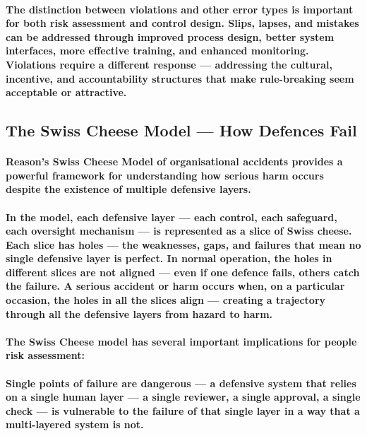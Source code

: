 \paragraph{The distinction between violations and other error types is important for both risk assessment and control design. Slips, lapses, and mistakes can be addressed through improved process design, better system interfaces, more effective training, and enhanced monitoring. Violations require a different response — addressing the cultural, incentive, and accountability structures that make rule-breaking seem acceptable or attractive.}

\subsection{The Swiss Cheese Model — How Defences Fail}
\paragraph{\textbf{Reason's Swiss Cheese Model} of organisational accidents provides a powerful framework for understanding how serious harm occurs despite the existence of multiple defensive layers.}
\paragraph{In the model, each defensive layer — each control, each safeguard, each oversight mechanism — is represented as a slice of Swiss cheese. Each slice has holes — the weaknesses, gaps, and failures that mean no single defensive layer is perfect. In normal operation, the holes in different slices are not aligned — even if one defence fails, others catch the failure. A serious accident or harm occurs when, on a particular occasion, the holes in all the slices align — creating a trajectory through all the defensive layers from hazard to harm.}
\paragraph{The Swiss Cheese model has several important implications for people risk assessment:}
\paragraph{\textbf{Single points of failure are dangerous} — a defensive system that relies on a single human layer — a single reviewer, a single approval, a single check — is vulnerable to the failure of that single layer in a way that a multi-layered system is not.}
